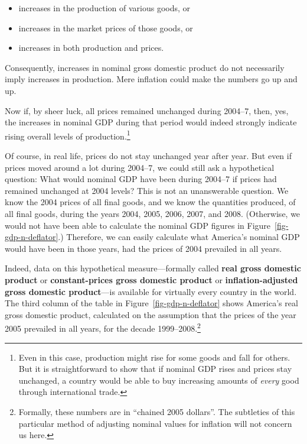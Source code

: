 \documentclass[
  letterpaper,
]{book}
\providecommand{\tightlist}{%
  \setlength{\itemsep}{0pt}\setlength{\parskip}{0pt}}\usepackage{longtable,booktabs,array}
\begin{document}
\begin{itemize}
\tightlist
\item
  increases in the production of various goods, or
\item
  increases in the market prices of those goods, or
\item
  increases in both production and prices.
\end{itemize}

Consequently, increases in nominal gross domestic product do not
necessarily imply increases in production. Mere inflation could make the
numbers go up and up.

Now if, by sheer luck, all prices remained unchanged during 2004--7,
then, yes, the increases in nominal GDP during that period would indeed
strongly indicate rising overall levels of production.\footnote{Even in
  this case, production might rise for some goods and fall for others.
  But it is straightforward to show that if nominal GDP rises and prices
  stay unchanged, a country would be able to buy increasing amounts of
  \emph{every} good through international trade.}

Of course, in real life, prices do not stay unchanged year after year.
But even if prices moved around a lot during 2004--7, we could still ask
a hypothetical question: What would nominal GDP have been during 2004--7
if prices had remained unchanged at 2004 levels? This is not an
unanswerable question. We know the 2004 prices of all final goods, and
we know the quantities produced, of all final goods, during the years
2004, 2005, 2006, 2007, and 2008. (Otherwise, we would not have been
able to calculate the nominal GDP figures in
Figure~\ref{fig-gdp-n-deflator}.) Therefore, we can easily calculate
what America's nominal GDP would have been in those years, had the
prices of 2004 prevailed in all years.

Indeed, data on this hypothetical measure---formally called \textbf{real
gross domestic product} or \textbf{constant-prices gross domestic
product} or \textbf{inflation-adjusted gross domestic product}---is
available for virtually every country in the world. The third column of
the table in Figure~\ref{fig-gdp-n-deflator} shows America's real gross
domestic product, calculated on the assumption that the prices of the
year 2005 prevailed in all years, for the decade 1999--2008.\footnote{Formally,
  these numbers are in ``chained 2005 dollars''. The subtleties of this
  particular method of adjusting nominal values for inflation will not
  concern us here.}
\end{document}
